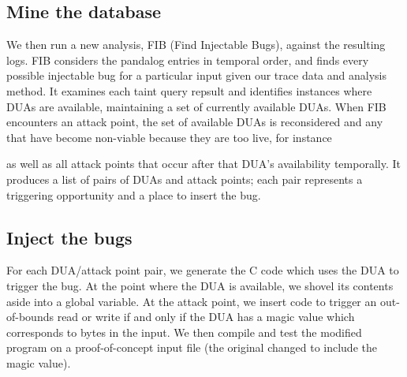 \subsection{Mine the database}
We then run a new analysis, FIB (Find Injectable Bugs), against the resulting logs.
FIB considers the pandalog entries in temporal order, and finds every possible injectable bug for a particular input given our trace data and analysis method.
It examines each taint query repsult and identifies instances where DUAs are available, maintaining a set of currently available DUAs.
When FIB encounters an attack point, the set of available DUAs is reconsidered and any that have become non-viable because they are too live, for instance

as well as all attack points that occur after that DUA's availability temporally.
It produces a list of pairs of DUAs and attack points; each pair represents a triggering opportunity and a place to insert the bug.



\subsection{Inject the bugs}
For each DUA/attack point pair, we generate the C code which uses the DUA to trigger the bug.
At the point where the DUA is available, we shovel its contents aside into a global variable.
At the attack point, we insert code to trigger an out-of-bounds read or write if and only if the DUA has a magic value which corresponds to bytes in the input.
We then compile and test the modified program on a proof-of-concept input file (the original changed to include the magic value).
